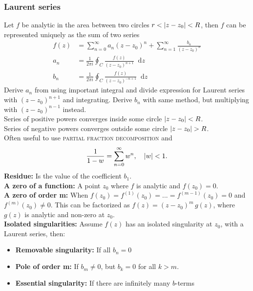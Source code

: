 \documentclass[a4paper, 10pt]{article}
\newcommand*\diff{\mathop{}\!\mathrm{d}}
\begin{document}
\begin{multicols*}{3}
\subsubsection*{Laurent series}
Let $f$ be analytic in the area between two circles $r < \abs{z-z_0} < R$, then $f$ can be represented uniquely as the sum of two series
\begin{align*}
  f(z) &= \sum_{n=0}^{\infty} a_n(z-z_0)^n + \sum_{n=1}^{\infty} \frac{b_n}{(z-z_0)^n} \\
  a_n &= \frac{1}{2\pi i} \oint_C \frac{f(z)}{(z-z_0)^{n+1}} \diff z \\
  b_n &= \frac{1}{2\pi i} \oint_C \frac{f(z)}{(z-z_0)^{-n+1}} \diff z
\end{align*}
Derive $a_n$ from using important integral and divide expression for Laurent series with $(z-z_0)^{n+1}$ and integrating. Derive $b_n$ with same method, but multiplying with $(z-z_0)^{n-1}$ instead.\\
Series of positive powers converges inside  some circle $\abs{z-z_0} < R$. \\
Series of negative powers converges outside some circle $\abs{z-z_0} > R$. \\
Often useful to use \textsc{partial fraction decomposition} and
\begin{equation*}
  \frac{1}{1-w} = \sum_{n=0}^{\infty} w^n, \quad \abs{w}<1.
\end{equation*}
\textbf{Residue:} Is the value of the coefficient $b_1$.\\
\textbf{A zero of a function:} A point $z_0$ where $f$ is analytic and $f(z_0)=0$.\\
\textbf{A zero of order m:} When $f(z_0) = f^{(1)}(z_0) = ... = f^{(m-1)}(z_0)=0$ and $f^(m)(z_0)\neq 0$. This can be factorized as $f(z) = (z-z_0)^m\,g(z)$, where $g(z)$ is analytic and non-zero at $z_0$.\\
\textbf{Isolated singularities:} Assume $f(z)$ has an isolated singularity at $z_0$, with a Laurent series, then:
\begin{itemize}
  \item \textbf{Removable singularity:} If all $b_n=0$
  \item \textbf{Pole of order m:} If $b_m\neq 0$, but $b_k=0$ for all $k>m$.
  \item \textbf{Essential singularity:} If there are infinitely many $b$-terms
\end{itemize}


\end{multicols*}
\end{document}
